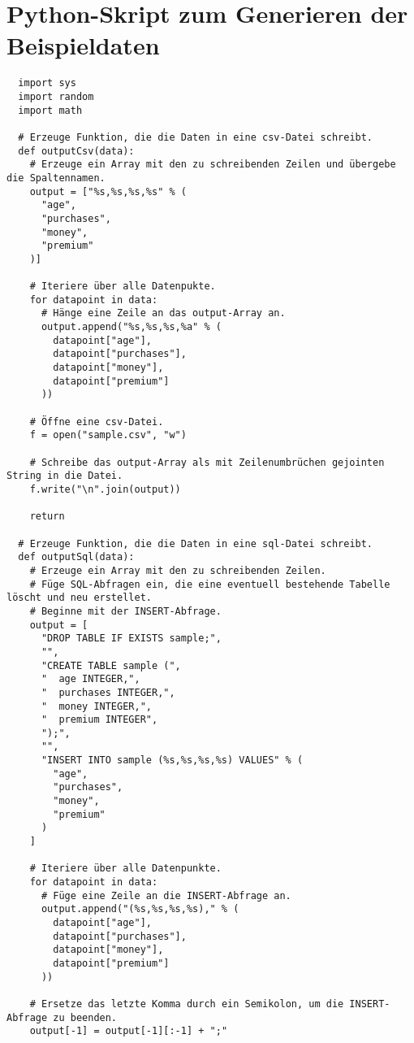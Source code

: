 \chapter{Python-Skript zum Generieren der Beispieldaten}
\label{appendix:A}

\begin{verbatim}
  import sys
  import random
  import math

  # Erzeuge Funktion, die die Daten in eine csv-Datei schreibt.
  def outputCsv(data):
    # Erzeuge ein Array mit den zu schreibenden Zeilen und übergebe die Spaltennamen.
    output = ["%s,%s,%s,%s" % (
      "age",
      "purchases",
      "money",
      "premium"
    )]

    # Iteriere über alle Datenpukte.
    for datapoint in data:
      # Hänge eine Zeile an das output-Array an.
      output.append("%s,%s,%s,%a" % (
        datapoint["age"],
        datapoint["purchases"],
        datapoint["money"],
        datapoint["premium"]
      ))

    # Öffne eine csv-Datei.
    f = open("sample.csv", "w")

    # Schreibe das output-Array als mit Zeilenumbrüchen gejointen String in die Datei.
    f.write("\n".join(output))

    return

  # Erzeuge Funktion, die die Daten in eine sql-Datei schreibt.
  def outputSql(data):
    # Erzeuge ein Array mit den zu schreibenden Zeilen.
    # Füge SQL-Abfragen ein, die eine eventuell bestehende Tabelle löscht und neu erstellet.
    # Beginne mit der INSERT-Abfrage.
    output = [
      "DROP TABLE IF EXISTS sample;",
      "",
      "CREATE TABLE sample (",
      "  age INTEGER,",
      "  purchases INTEGER,",
      "  money INTEGER,",
      "  premium INTEGER",
      ");",
      "",
      "INSERT INTO sample (%s,%s,%s,%s) VALUES" % (
        "age",
        "purchases",
        "money",
        "premium"
      )
    ]

    # Iteriere über alle Datenpunkte.
    for datapoint in data:
      # Füge eine Zeile an die INSERT-Abfrage an.
      output.append("(%s,%s,%s,%s)," % (
        datapoint["age"],
        datapoint["purchases"],
        datapoint["money"],
        datapoint["premium"]
      ))

    # Ersetze das letzte Komma durch ein Semikolon, um die INSERT-Abfrage zu beenden.
    output[-1] = output[-1][:-1] + ";"


\end{verbatim}
